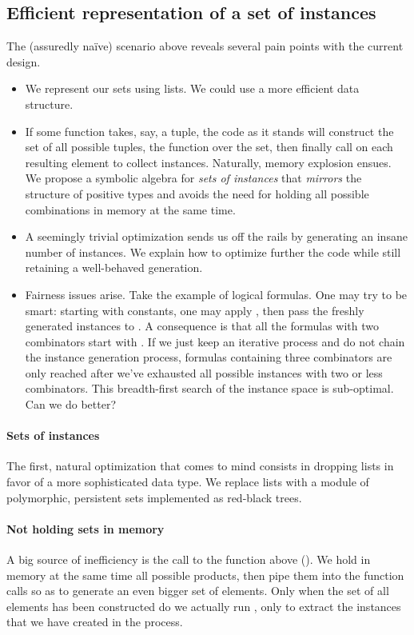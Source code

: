 \subsection{Efficient representation of a set of instances}
\label{sec:efficient}

The (assuredly naïve) scenario above reveals several pain points with the
current design.
\begin{itemize}
  \item We represent our sets using lists. We could use a more efficient data
    structure.
  \item If some function takes, say, a tuple, the code as it stands will
    construct the set of all possible tuples,  the function over the
    set, then finally call  on each resulting element to collect
    instances.  Naturally, memory explosion ensues. We propose a symbolic
    algebra for \emph{sets of instances} that \emph{mirrors} the structure of
    positive types and avoids the need for holding all possible combinations in
    memory at the same time.
  \item A seemingly trivial optimization sends us off the rails by generating an
    insane number of instances. We explain how to optimize further the code
    while still retaining a well-behaved generation.
  \item Fairness issues arise.
    Take the example of logical formulas. One may try to be smart: starting with
    constants, one may apply , then pass the freshly generated
    instances to . A consequence is that all the formulas with two
    combinators start with . If we just keep an iterative process and
    do not chain the instance generation process, formulas containing three
    combinators are only reached after we've exhausted all possible instances
    with two or less combinators. This breadth-first search of the instance
    space is sub-optimal. Can we do better?
\end{itemize}
%

\paragraph{Sets of instances}
The first, natural optimization that comes to mind consists in dropping lists in
favor of a more sophisticated data type. We replace lists with a module
 of polymorphic, persistent sets implemented as red-black trees.


\paragraph{Not holding sets in memory}
A big source of inefficiency is the call to the
 function above (). We hold in memory
at the same time all possible products, then pipe them into the function calls
so as to generate an even bigger set of elements. Only when the set of all
elements has been constructed do we actually run , only to
extract the instances that we have created in the process.

